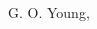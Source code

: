 \documentclass[letterpaper, 10 pt, conference]{ieeeconf}  %
\begin{document}




\begin{thebibliography}{99}

 G. O. Young,


\end{thebibliography}
\end{document}
